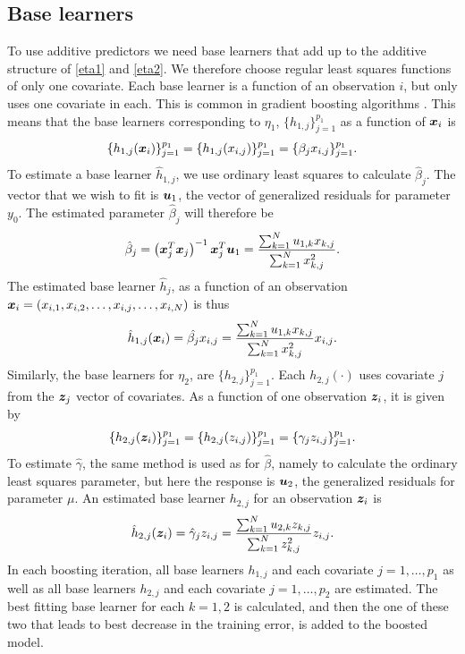 \subsection{Base learners}
To use additive predictors we need base learners that add up to the additive structure of \eqref{eta1} and \eqref{eta2}.
We therefore choose regular least squares functions of only one covariate.
Each base learner is a function of an observation $i$, but only uses one covariate in each.
This is common in gradient boosting algorithms \citep{gamboost}.
This means that the base learners corresponding to $\eta_1$, $\{h_{1,j}\}_{j=1}^{p_1}$ as a function of $\bm{x}_i$ is
\begin{equation*}
    \{h_{1,j}(\bm{x}_i)\}_{j=1}^{p_1}=\{h_{1,j}(x_{i,j})\}_{j=1}^{p_1}=\{\beta_jx_{i,j}\}_{j=1}^{p_1}.
\end{equation*}
To estimate a base learner $\hat{h}_{1,j}$, we use ordinary least squares to calculate $\hat{\beta}_j$.
The vector that we wish to fit is $\bm{u}_1$, the vector of generalized residuals for parameter $y_0$.
The estimated parameter $\hat{\beta}_j$ will therefore be
\begin{equation*}
    \hat{\beta}_j=\left(\bm{x}_j^T\bm{x}_j\right)^{-1}\bm{x}_j^T \bm{u}_1=\frac{\sum_{k=1}^N u_{1,k}x_{k,j}}{\sum_{k=1}^N x_{k,j}^2}.
\end{equation*}
The estimated base learner $\hat{h}_j$, as a function of an observation $\bm{x}_i=(x_{i,1},x_{i,2},\ldots,x_{i,j},\ldots,x_{i,N})$ is thus
\begin{equation*}
    \hat{h}_{1,j}(\bm{x}_i)=\hat{\beta_j}x_{i,j}=\frac{\sum_{k=1}^N u_{1,k}x_{k,j}}{\sum_{k=1}^N x_{k,j}^2}x_{i,j}.
\end{equation*}
Similarly, the base learners for $\eta_2$, are $\{h_{2,j}\}_{j=1}^{p_1}$.
Each $h_{2,j}(\cdot)$ uses covariate $j$ from the $\bm{z}_j$ vector of covariates.
As a function of one observation $\bm{z}_i$, it is given by
\begin{equation*}
    \{h_{2,j}(\bm{z}_i)\}_{j=1}^{p_1}=\{h_{2,j}(z_{i,j})\}_{j=1}^{p_1}=\{\gamma_jz_{i,j}\}_{j=1}^{p_1}.
\end{equation*}
To estimate $\hat{\gamma}$, the same method is used as for $\hat{\beta}$, namely to calculate the ordinary least squares parameter, but here the response is $\bm{u}_2$, the generalized residuals for parameter $\mu$.
An estimated base learner $h_{2,j}$ for an observation $\bm{z}_i$ is
\begin{equation*}
    \hat{h}_{2,j}(\bm{z}_i)=\hat{\gamma}_jz_{i,j}=\frac{\sum_{k=1}^N u_{2,k}z_{k,j}}{\sum_{k=1}^N z_{k,j}^2}z_{i,j}.
\end{equation*}
In each boosting iteration, all base learners $h_{1,j}$ and each covariate $j=1,\ldots,p_1$ as well as all base learners $h_{2,j}$ and each covariate $j=1,\ldots,p_2$ are estimated.
The best fitting base learner for each $k=1,2$ is calculated, and then the one of these two that leads to best decrease in the training error, is added to the boosted model.

